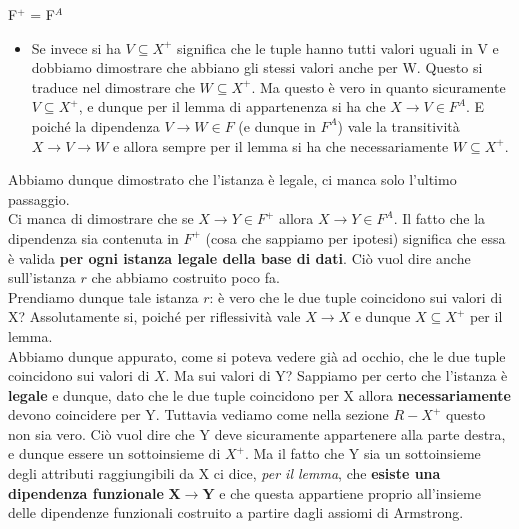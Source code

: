 \documentclass[12pt]{report}
\newcommand{\ra}{
	\rightarrow
}
\begin{document}
\begin{dimostrazione}{F$^+$ = F$^A$}{}
\begin{itemize}
			\item Se invece si ha $V \subseteq X^+$ significa che le tuple hanno tutti valori uguali in V e dobbiamo dimostrare che abbiano gli stessi valori anche per W. Questo si traduce nel dimostrare che $W \subseteq X^+$. Ma questo è vero in quanto sicuramente $V \subseteq X^+$, e dunque per il lemma di appartenenza si ha che $X \ra V \in F^A$. E poiché la dipendenza $V \ra W \in F$ (e dunque in $F^A$) vale la transitività $X \ra V \ra W$ e allora sempre per il lemma si ha che necessariamente $W \subseteq X^+$.
		\end{itemize}
		Abbiamo dunque dimostrato che l'istanza è legale, ci manca solo l'ultimo passaggio.\\
		Ci manca di dimostrare che se $X \ra Y \in F^+$ allora $X \ra Y \in F^A$. Il fatto che la dipendenza sia contenuta in $F^+$ (cosa che sappiamo per ipotesi) significa che essa è valida \textbf{per ogni istanza legale della base di dati}. Ciò vuol dire anche sull'istanza $r$ che abbiamo costruito poco fa.\\
		Prendiamo dunque tale istanza $r$: è vero che le due tuple coincidono sui valori di X? Assolutamente si, poiché per riflessività vale $X \ra X$ e dunque $X \subseteq X^+$ per il lemma.\\
		Abbiamo dunque appurato, come si poteva vedere già ad occhio, che le due tuple coincidono sui valori di $X$. Ma sui valori di Y? Sappiamo per certo che l'istanza è \textbf{legale} e dunque, dato che le due tuple coincidono per X allora \textbf{necessariamente} devono coincidere per Y. Tuttavia vediamo come nella sezione $R - X^+$ questo non sia vero. Ciò vuol dire che Y deve sicuramente appartenere alla parte destra, e dunque essere un sottoinsieme di $X^+$. Ma il fatto che Y sia un sottoinsieme degli attributi raggiungibili da X ci dice, \textit{per il lemma}, che \textbf{esiste una dipendenza funzionale} $\mathbf{X \ra Y}$ e che questa appartiene proprio all'insieme delle dipendenze funzionali costruito a partire dagli assiomi di Armstrong.		
	\end{dimostrazione}
	
\end{document}
